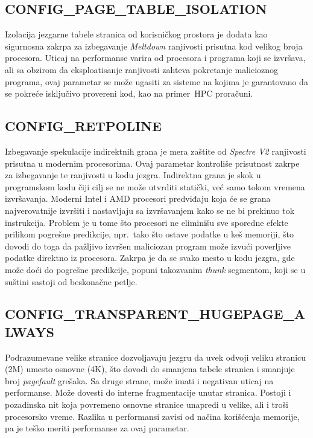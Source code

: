 \documentclass[12pt]{report}
\begin{document}
\subsection{CONFIG\_PAGE\_TABLE\_ISOLATION}
Izolacija jezgarne tabele stranica od korisničkog prostora je dodata kao sigurnosna zakrpa za izbegavanje \textit{Meltdown} ranjivosti prisutna kod velikog broja procesora. Uticaj na performanse varira od procesora i programa koji se izvršava, ali sa obzirom da eksploatisanje ranjivosti zahteva pokretanje malicioznog programa, ovaj parametar se može ugasiti za sisteme na kojima je garantovano da se pokreće isključivo provereni kod, kao na primer\ HPC proračuni.

\subsection{CONFIG\_RETPOLINE}
Izbegavanje spekulacije indirektnih grana je mera zaštite od \textit{Spectre V2} ranjivosti prisutna u modernim procesorima. Ovaj parametar kontroliše prisutnost zakrpe za izbegavanje te ranjivosti u kodu jezgra. Indirektna grana je skok u programskom kodu čiji cilj se ne može utvrditi statički, već samo tokom vremena izvršavanja. Moderni Intel i AMD procesori predviđaju koja će se grana najverovatnije izvršiti i nastavljaju sa izvršavanjem kako se ne bi prekinuo tok instrukcija. Problem je u tome što procesori ne eliminišu sve sporedne efekte prilikom pogrešne predikcije, npr.\ tako što ostave podatke u keš memoriji, što dovodi do toga da pažljivo izvršen maliciozan program može izvući poverljive podatke direktno iz procesora. Zakrpa je da se svako mesto u kodu jezgra, gde može doći do pogrešne predikcije, popuni takozvanim \textit{thunk} segmentom, koji se u suštini sastoji od beskonačne petlje.

\subsection{CONFIG\_TRANSPARENT\_HUGEPAGE\_ALWAYS}
Podrazumevane velike stranice dozvoljavaju jezgru da uvek odvoji veliku stranicu (2M) umesto osnovne (4K), što dovodi do smanjena tabele stranica i smanjuje broj \textit{pagefault} grešaka. Sa druge strane, može imati i negativan uticaj na performanse. Može dovesti do interne fragmentacije unutar stranica. Postoji i pozadinska nit koja povremeno osnovne stranice unapredi u velike, ali i troši procesorsko vreme. Razlika u performansi zavisi od načina korišćenja memorije, pa je teško meriti performanse za ovaj parametar.
\end{document}

